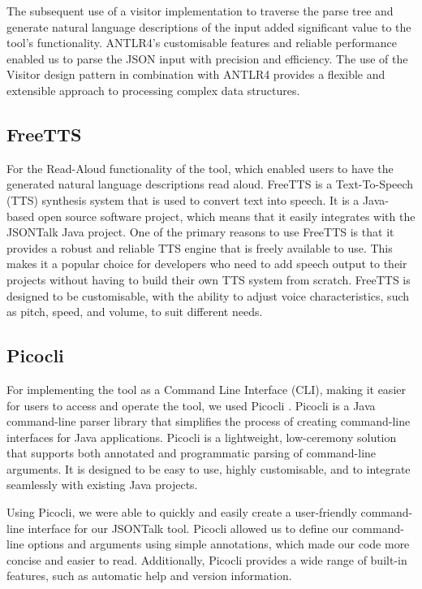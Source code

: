 \documentclass{l4proj}
\begin{document}
 The subsequent use of a visitor implementation to traverse the parse tree and generate natural language descriptions of the input added significant value to the tool's functionality. ANTLR4's customisable features and reliable performance enabled us to parse the JSON input with precision and efficiency. The use of the Visitor design pattern in combination with ANTLR4 provides a flexible and extensible approach to processing complex data structures.

\subsection{FreeTTS}

For the Read-Aloud functionality of the tool, which enabled users to have the generated natural language descriptions read aloud. FreeTTS \cite{freetts} is a Text-To-Speech (TTS) synthesis system that is used to convert text into speech. It is a Java-based open source software project, which means that it easily integrates with the JSONTalk Java project.  One of the primary reasons to use FreeTTS is that it provides a robust and reliable TTS engine that is freely available to use. This makes it a popular choice for developers who need to add speech output to their projects without having to build their own TTS system from scratch. FreeTTS is designed to be customisable, with the ability to adjust voice characteristics, such as pitch, speed, and volume, to suit different needs.

\subsection{Picocli}

 For implementing the tool as a Command Line Interface (CLI), making it easier for users to access and operate the tool, we used Picocli \cite{picocli}. Picocli is a Java command-line parser library that simplifies the process of creating command-line interfaces for Java applications. Picocli is a lightweight, low-ceremony solution that supports both annotated and programmatic parsing of command-line arguments. It is designed to be easy to use, highly customisable, and to integrate seamlessly with existing Java projects.
    
Using Picocli, we were able to quickly and easily create a user-friendly command-line interface for our JSONTalk tool. Picocli allowed us to define our command-line options and arguments using simple annotations, which made our code more concise and easier to read. Additionally, Picocli provides a wide range of built-in features, such as automatic help and version information.
\end{document}
